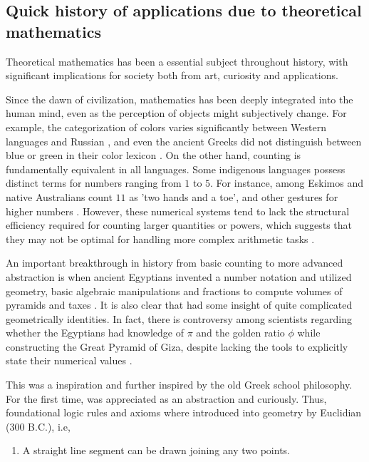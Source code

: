 \documentclass[10pt,conference]{IEEEtran}
\begin{document}
\begin{sloppy}
\section{Quick history of applications due to theoretical mathematics}\label{sec:introduction}

Theoretical mathematics has been a essential subject throughout history, with significant implications for society both from art, curiosity and applications.

Since the dawn of civilization, mathematics has been deeply integrated into the human mind, even as the perception of objects might subjectively change. For example, the categorization of colors varies significantly between Western languages and
Russian \cite{maier2018native}, and even the ancient Greeks did not distinguish between blue or green in their color lexicon \cite{durao2022did}. On the other hand, counting is fundamentally equivalent in all languages. Some indigenous languages
possess distinct terms for numbers ranging from $1$ to $5$. For instance, among Eskimos and native Australians count $11$ as 'two hands and a toe', and other gestures for higher numbers \cite{gow2010short}.  However, these numerical systems tend to lack the structural efficiency required for counting larger quantities or powers, which suggests that they may not be optimal for handling more complex arithmetic tasks \cite{beller2008limits}.

An important breakthrough in history from basic counting to more advanced abstraction is when ancient Egyptians invented a number notation and utilized geometry, basic algebraic manipulations and fractions to compute volumes of pyramids and taxes \cite{imhausen2016mathematics}. It is also clear that had some insight of quite complicated geometrically identities. In fact, there is controversy among scientists regarding whether the Egyptians had knowledge of $\pi$ and the golden ratio $\phi$ while constructing the Great Pyramid of Giza, despite lacking the tools to explicitly state their numerical values \cite{robins1985mathematical}.

This was a inspiration and further inspired by the old Greek school philosophy. For the first time, was appreciated as an abstraction and curiously. Thus, foundational logic rules and axioms where introduced into geometry by Euclidian (300 B.C.),
i.e,
\begin{enumerate}
    \item  A straight line segment can be drawn joining any two points.


\end{enumerate}
\end{sloppy}
\end{document}
